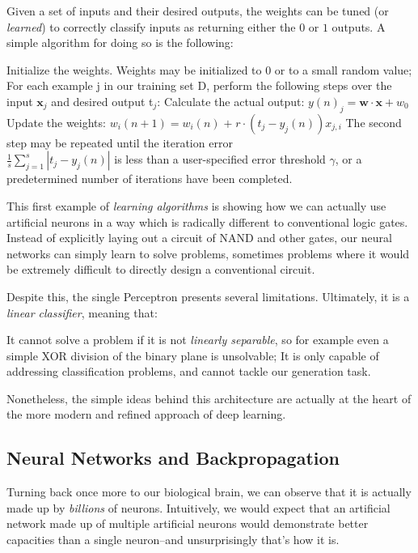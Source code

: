 Given a set of inputs and their desired outputs, the weights can be tuned (or \emph{learned}) to correctly classify inputs as returning either the $0$ or $1$ outputs. A simple algorithm for doing so is the following:

\begin{outline}[enumerate]
    \1 Initialize the weights. Weights may be initialized to $0$ or to a small random value;
    \1 For each example j in our training set D, perform the following steps over the input $\mathbf {x}_{j}$ and desired output t$_{j}$:
    \2 Calculate the actual output: $y(n)_j = \mathbf{w}\cdot\mathbf{x} + w_0 $
    \2 Update the weights:  $w_{i}(n+1)=w_{i}(n)\;{\boldsymbol {+}}\;r\cdot (t_{j}-y_{j}(n))x_{j,i}$
    \1 The second step may be repeated until the iteration error \\
    $\frac{1}{s} \sum_{j=1}^{s}|t_{j}-y_{j}(n)|$ is less than a user-specified error threshold $\gamma$, or a predetermined number of iterations have been completed.
\end{outline}

This first example of \emph{learning algorithms} is showing how we can actually use artificial neurons in a way which is radically different to conventional logic gates. Instead of explicitly laying out a circuit of NAND and other gates, our neural networks can simply learn to solve problems, sometimes problems where it would be extremely difficult to directly design a conventional circuit.

Despite this, the single Perceptron presents several limitations. Ultimately, it is a \emph{linear classifier}, meaning that:

\begin{outline}
    \1 It cannot solve a problem if it is not \emph{linearly separable}, so for example even a simple XOR division of the binary plane is unsolvable;
    \1 It is only capable of addressing classification problems, and cannot tackle our generation task.
\end{outline}

Nonetheless, the simple ideas behind this architecture are actually at the heart of the more modern and refined approach of deep learning.

\subsection{Neural Networks and Backpropagation}\label{sec:backprop}

Turning back once more to our biological brain, we can observe that it is actually made up by \emph{billions} of neurons. Intuitively, we would expect that an artificial network made up of multiple artificial neurons would demonstrate better capacities than a single neuron--and unsurprisingly that's how it is. 

